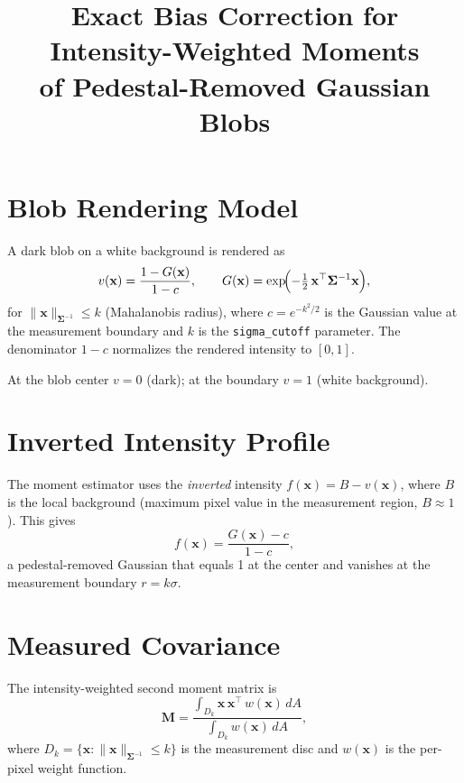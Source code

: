 \documentclass[11pt]{article}
\title{Exact Bias Correction for Intensity-Weighted Moments\\of Pedestal-Removed Gaussian Blobs}
\author{}
\date{}
\newcommand{\vect}[1]{\mathbf{#1}}
\newcommand{\mat}[1]{\mathbf{#1}}
\begin{document}
\maketitle

\section{Blob Rendering Model}

A dark blob on a white background is rendered as
\begin{equation}\label{eq:render}
  v(\vect{x}) = \frac{1 - G(\vect{x})}{1 - c}, \qquad
  G(\vect{x}) = \exp\!\Bigl(-\tfrac{1}{2}\,\vect{x}^\top \mat{\Sigma}^{-1}\vect{x}\Bigr),
\end{equation}
for $\|\vect{x}\|_{\mat{\Sigma}^{-1}} \le k$ (Mahalanobis radius), where
$c = e^{-k^2/2}$ is the Gaussian value at the measurement boundary and $k$ is
the \texttt{sigma\_cutoff} parameter. The denominator $1-c$ normalizes the
rendered intensity to $[0,1]$.

At the blob center $v = 0$ (dark); at the boundary $v = 1$ (white background).

\section{Inverted Intensity Profile}

The moment estimator uses the \emph{inverted} intensity
$f(\vect{x}) = B - v(\vect{x})$, where $B$ is the local background (maximum
pixel value in the measurement region, $B \approx 1$). This gives
\begin{equation}\label{eq:f}
  f(\vect{x}) = \frac{G(\vect{x}) - c}{1 - c},
\end{equation}
a pedestal-removed Gaussian that equals 1 at the center and vanishes at the
measurement boundary $r = k\sigma$.

\section{Measured Covariance}

The intensity-weighted second moment matrix is
\begin{equation}
  \mat{M} = \frac{\int_{D_k} \vect{x}\,\vect{x}^\top\, w(\vect{x})\,dA}
                  {\int_{D_k} w(\vect{x})\,dA},
\end{equation}
where $D_k = \{\vect{x} : \|\vect{x}\|_{\mat{\Sigma}^{-1}} \le k\}$ is the
measurement disc and $w(\vect{x})$ is the per-pixel weight function.
\end{document}
